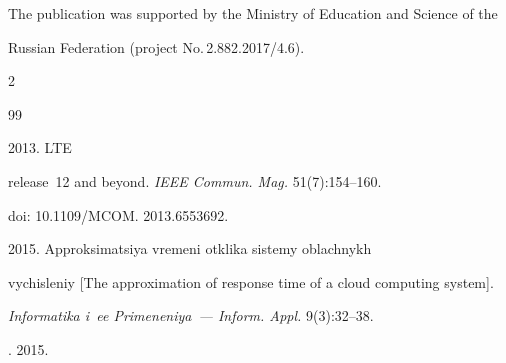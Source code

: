 The publication was supported by the Ministry of Education and Science of the 


Russian Federation (project No.\,2.882.2017/4.6). 











\vspace*{12pt}





  \begin{multicols}{2}





\renewcommand{\bibname}{\protect\rmfamily References}







{\small\frenchspacing


 {%




 \begin{thebibliography}{99}




 2013. LTE 


release~12 and beyond. \textit{IEEE Commun. Mag.} 51(7):154--160. 


doi: 10.1109/MCOM. 2013.6553692. 










 2015. Approksimatsiya vremeni otklika sistemy oblachnykh 


vychisleniy [The approximation of response time of a cloud computing system]. 


\textit{Informatika i~ee Primeneniya~--- Inform. Appl.} 9(3):32--38.







. 2015. 



\end{thebibliography}}}
\end{multicols}
